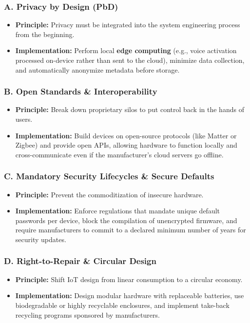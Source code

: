 \subsubsection{A. Privacy by Design (PbD)}
\begin{itemize}
  \item   \textbf{Principle:} Privacy must be integrated into the system engineering process from the beginning.
  \item   \textbf{Implementation:} Perform local \textbf{edge computing} (e.g., voice activation processed on-device rather than sent to the cloud), minimize data collection, and automatically anonymize metadata before storage.
\end{itemize}

\subsubsection{B. Open Standards \& Interoperability}
\begin{itemize}
  \item   \textbf{Principle:} Break down proprietary silos to put control back in the hands of users.
  \item   \textbf{Implementation:} Build devices on open-source protocols (like Matter or Zigbee) and provide open APIs, allowing hardware to function locally and cross-communicate even if the manufacturer's cloud servers go offline.
\end{itemize}

\subsubsection{C. Mandatory Security Lifecycles \& Secure Defaults}
\begin{itemize}
  \item   \textbf{Principle:} Prevent the commoditization of insecure hardware.
  \item   \textbf{Implementation:} Enforce regulations that mandate unique default passwords per device, block the compilation of unencrypted firmware, and require manufacturers to commit to a declared minimum number of years for security updates.
\end{itemize}

\subsubsection{D. Right-to-Repair \& Circular Design}
\begin{itemize}
  \item   \textbf{Principle:} Shift IoT design from linear consumption to a circular economy.
  \item   \textbf{Implementation:} Design modular hardware with replaceable batteries, use biodegradable or highly recyclable enclosures, and implement take-back recycling programs sponsored by manufacturers.
\end{itemize}


